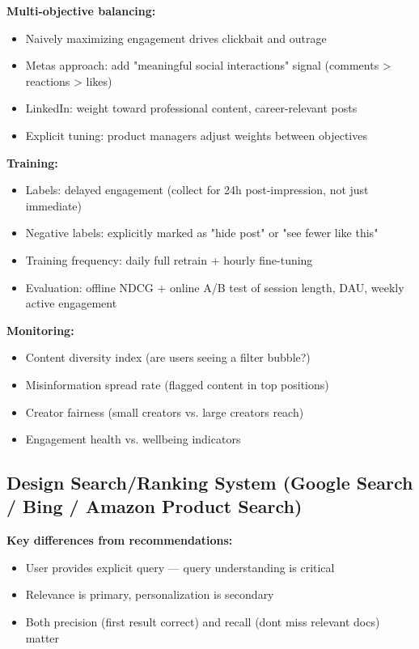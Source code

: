 \documentclass[11pt]{article}
\providecommand{\tightlist}{\setlength{\itemsep}{1pt}\setlength{\parskip}{0pt}}
\begin{document}
\textbf{Multi-objective balancing:}

\begin{itemize}
\tightlist
\item
  Naively maximizing engagement drives clickbait and outrage
\item
  Meta\textquotesingle s approach: add "meaningful social interactions" signal (comments \textgreater{} reactions \textgreater{} likes)
\item
  LinkedIn: weight toward professional content, career-relevant posts
\item
  Explicit tuning: product managers adjust weights between objectives
\end{itemize}

\textbf{Training:}

\begin{itemize}
\tightlist
\item
  Labels: delayed engagement (collect for 24h post-impression, not just immediate)
\item
  Negative labels: explicitly marked as "hide post" or "see fewer like this"
\item
  Training frequency: daily full retrain + hourly fine-tuning
\item
  Evaluation: offline NDCG + online A/B test of session length, DAU, weekly active engagement
\end{itemize}

\textbf{Monitoring:}

\begin{itemize}
\tightlist
\item
  Content diversity index (are users seeing a filter bubble?)
\item
  Misinformation spread rate (flagged content in top positions)
\item
  Creator fairness (small creators vs. large creators reach)
\item
  Engagement health vs. wellbeing indicators
\end{itemize}

\subsection{Design Search/Ranking System (Google Search / Bing / Amazon Product Search)}\label{design-searchranking-system-google-search--bing--amazon-product-search}

\textbf{Key differences from recommendations:}

\begin{itemize}
\tightlist
\item
  User provides explicit query --- query understanding is critical
\item
  Relevance is primary, personalization is secondary
\item
  Both precision (first result correct) and recall (don\textquotesingle t miss relevant docs) matter
\end{itemize}
\end{document}
